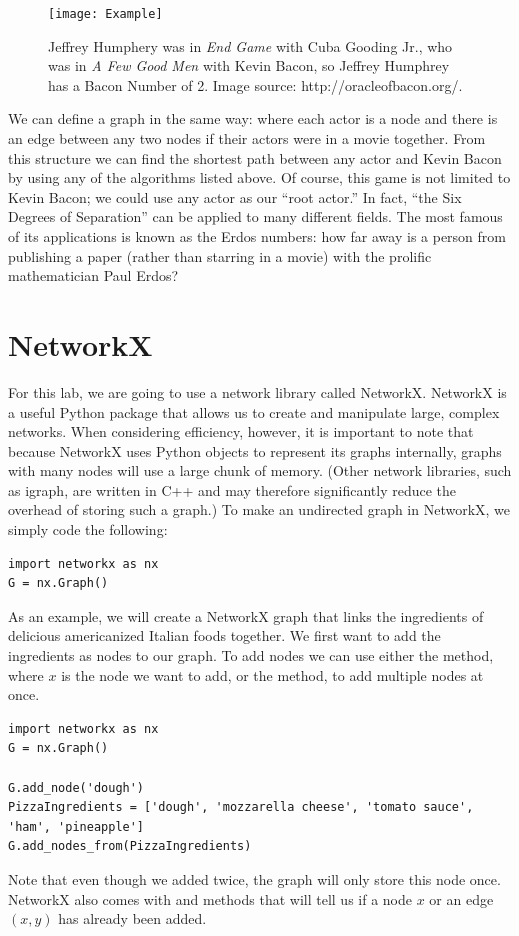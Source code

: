 \begin{figure}[h]
\texttt{[image: Example]}
\caption{Jeffrey Humphery was in \emph{End Game} with Cuba Gooding Jr., who was in \emph{A Few Good Men} with Kevin Bacon, so Jeffrey Humphrey has a Bacon Number of 2.  Image source: http://oracleofbacon.org/.}
\end{figure}

We can define a graph in the same way: where each actor is a node and there is an edge between any two nodes if their actors were in a movie together. From this structure we can find
the shortest path between any actor and Kevin Bacon by using any of the algorithms listed above. Of course, this game is not limited to Kevin Bacon; we could use any actor as our ``root actor.'' 
In fact, ``the Six Degrees of Separation'' can be applied to many different fields. The most famous of its applications is known as the Erdos numbers: how far away is a person
 from publishing a paper (rather than starring in a movie) with the prolific mathematician Paul Erdos?

\section*{NetworkX}
For this lab, we are going to use a network library called NetworkX. NetworkX is a useful Python package that allows us to create and manipulate large, complex networks.
When considering efficiency, however, it is important to note that because NetworkX uses Python objects to represent its graphs internally, graphs with many nodes will
use a large chunk of memory. (Other network libraries, such as igraph, are written in C++ and may therefore significantly reduce the overhead of storing such a graph.)
To make an undirected graph in NetworkX, we simply code the following:

\begin{lstlisting}
import networkx as nx
G = nx.Graph()
\end{lstlisting}

As an example, we will create a NetworkX graph that links the ingredients of
delicious americanized Italian foods together. We first want to add the ingredients as nodes
to our graph. To add nodes we can use either the  method, where $x$
is the node we want to add, or the  method, to
add multiple nodes at once.

\begin{lstlisting}
import networkx as nx
G = nx.Graph()

G.add_node('dough')
PizzaIngredients = ['dough', 'mozzarella cheese', 'tomato sauce', 'ham', 'pineapple']
G.add_nodes_from(PizzaIngredients)
\end{lstlisting}
Note that even though we added  twice, the graph will only store this node once. NetworkX also comes with  and  methods that will tell
us if a node $x$ or an edge $(x,y)$ has already been added.

